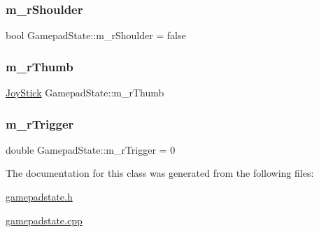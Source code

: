 \subsubsection{\texorpdfstring{m\+\_\+r\+Shoulder}{m\_rShoulder}}
{\footnotesize\ttfamily bool Gamepad\+State\+::m\+\_\+r\+Shoulder = false}

\mbox{\label{class_gamepad_state_a03e27d5da92668c65855206e525734c9}} 
\subsubsection{\texorpdfstring{m\+\_\+r\+Thumb}{m\_rThumb}}
{\footnotesize\ttfamily \mbox{\hyperlink{struct_gamepad_state_1_1_joy_stick}{Joy\+Stick}} Gamepad\+State\+::m\+\_\+r\+Thumb}

\mbox{\label{class_gamepad_state_a7fda49285c96e6ebfb2ff859d8f49d25}} 
\subsubsection{\texorpdfstring{m\+\_\+r\+Trigger}{m\_rTrigger}}
{\footnotesize\ttfamily double Gamepad\+State\+::m\+\_\+r\+Trigger = 0}



The documentation for this class was generated from the following files\+:\begin{DoxyCompactItemize}
\item 
\mbox{\hyperlink{gamepadstate_8h}{gamepadstate.\+h}}\item 
\mbox{\hyperlink{gamepadstate_8cpp}{gamepadstate.\+cpp}}\end{DoxyCompactItemize}

